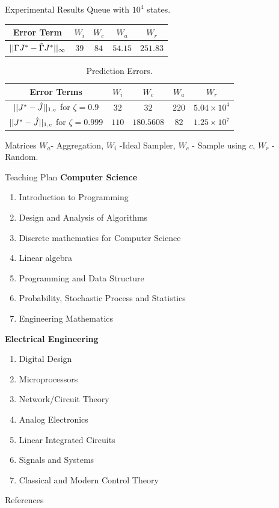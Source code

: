 \documentclass[10pt,handout]{beamer}
\begin{document}
\begin{frame}[fragile]{Experimental Results}
Queue with $10^4$ states.
\begin{table}
\begin{tabular}{|c|c|c|c|c|}\hline
Error Term&     $W_i$&  $W_c$& $W_a$& $W_r$ \\\hline
$||\Gamma J^*-\hat{\Gamma} J^*||_\infty$ & $39$    &$84$& $54.15$& $251.83$ \\\hline
\end{tabular}
\end{table}

\begin{table}
\begin{center}
\begin{tabular}{|c|c|c|c|c|}\hline
Error Terms&    $W_i$&  $W_c$& $W_a$& $W_r$ \\\hline
$||J^*-\hat{J}||_{1,c}$ for $\zeta=0.9$& $32$&      $32$& $220$& $5.04\times 10^4$ \\\hline
$||J^*-\hat{J}||_{1,c}$ for $\zeta=0.999$& $110$&   $180.5608$& $82$& $1.25\times 10^7$ \\\hline
\end{tabular}
\end{center}
\caption*{Prediction Errors.}
\label{perf1}
\end{table}
\begin{block}{Matrices}
$W_a$- Aggregation, $W_i$ -Ideal Sampler, $W_c$ - Sample using $c$, $W_r$ - Random.
\end{block}


\end{frame}

\begin{frame}[fragile]{Teaching Plan}
\textbf{Computer Science}
\begin{enumerate}
\item Introduction to Programming
\item Design and Analysis of Algorithms
\item Discrete mathematics for Computer Science
\item Linear algebra
\item Programming and Data Structure
\item Probability, Stochastic Process and Statistics
\item Engineering Mathematics
\end{enumerate}
\textbf{Electrical Engineering}
\begin{enumerate}
\item Digital Design
\item Microprocessors
\item Network/Circuit Theory
\item Analog Electronics
\item Linear Integrated Circuits
\item Signals and Systems
\item Classical and Modern Control Theory
\end{enumerate}

\end{frame}


\begin{frame}[allowframebreaks]{References}


\end{frame}
\end{document}
